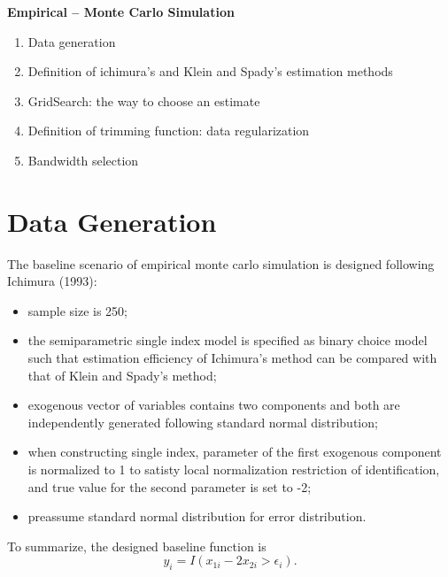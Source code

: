 \documentclass[a4paper]{article}
\begin{document}
\textbf{Empirical -- Monte Carlo Simulation}
\begin{enumerate}
\item Data generation
\item Definition of ichimura's and Klein and Spady's estimation methods
\item GridSearch: the way to choose an estimate
\item Definition of trimming function: data regularization
\item Bandwidth selection


\end{enumerate}
\section{Data Generation}
The baseline scenario of empirical monte carlo simulation is designed following Ichimura (1993): 
\begin{itemize}
\item sample size is 250;
\item the semiparametric single index model is specified as binary choice model such that estimation efficiency of Ichimura's method can be compared with that of Klein and Spady's method;
\item exogenous vector of variables contains two components and both are independently generated following standard normal distribution;
\item when constructing single index, parameter of the first exogenous component is normalized to 1 to satisty local normalization restriction of identification, and true value for the second parameter is set to -2;
\item preassume standard normal distribution for error distribution.
\end{itemize}
To summarize, the designed baseline function is
\begin{equation*}
y_i = I(x_{1i} - 2x_{2i} > \epsilon_i).
\end{equation*}
\end{document}

